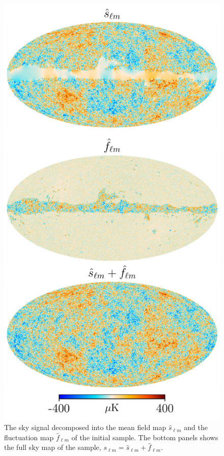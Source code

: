 \documentclass[twocolumn]{../common/aa}
\begin{document}
\begin{figure}
	\centering
	\includegraphics[width=\linewidth]{figures/s_hat_f_hat.pdf}
	\caption{\label{fig:sky_map}The sky signal decomposed into the mean field map $\hat{s}_{\ell m}$ and the fluctuation map $\hat{f}_{\ell m}$ of the initial sample. The bottom panels shows the full sky map of the sample, $s_{\ell m} = \hat{s}_{\ell m} + \hat{f}_{\ell m}$.}
\end{figure}
\end{document}
